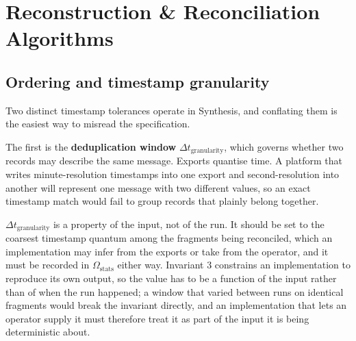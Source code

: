 
\section{Reconstruction \& Reconciliation Algorithms}
\label{sec:algorithms}

\subsection{Ordering and timestamp granularity}
\label{sec:algorithms:ordering}

Two distinct timestamp tolerances operate in Synthesis, and conflating them is
the easiest way to misread the specification.

The first is the \textbf{deduplication window} $\Delta t_{\text{granularity}}$,
which governs whether two records may describe the same message. Exports quantise
time. A platform that writes minute-resolution timestamps into one export and
second-resolution into another will represent one message with two different
values, so an exact timestamp match would fail to group records that plainly
belong together.

$\Delta t_{\text{granularity}}$ is a property of the input, not of the run. It
should be set to the coarsest timestamp quantum among the fragments being
reconciled, which an implementation may infer from the exports or take from the
operator, and it must be recorded in $\Omega_{\text{stats}}$ either way.
Invariant 3 constrains an implementation to reproduce its own output, so the
value has to be a function of the input rather than of when the run happened; a
window that varied between runs on identical fragments would break the invariant
directly, and an implementation that lets an operator supply it must therefore
treat it as part of the input it is being deterministic about.

